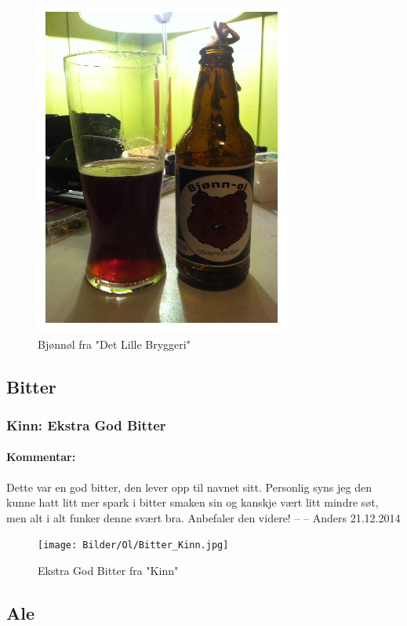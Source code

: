 \documentclass[12pt,a4paper,oneside,norsk]{article}
\begin{document}
\begin{figure} [H]
\centering
\includegraphics[scale=1.00]{Bilder/Ol/bjonnol.PNG} 
\caption{Bjønnøl fra "Det Lille Bryggeri"}
\end{figure}

\newpage
\subsection{Bitter}

\subsubsection{Kinn: Ekstra God Bitter}
\paragraph{Kommentar:}Dette var en god bitter, den lever opp til navnet sitt. Personlig syns jeg den kunne hatt litt mer spark i bitter smaken sin og kanskje vært litt mindre søt, men alt i alt funker denne svært bra. Anbefaler den videre! 
\newline
-- -- Anders 21.12.2014

\begin{figure} [H]
\centering
\texttt{[image: Bilder/Ol/Bitter\_Kinn.jpg]} 
\caption{Ekstra God Bitter fra "Kinn"}
\end{figure}


\newpage
\subsection{Ale}
\end{document}
